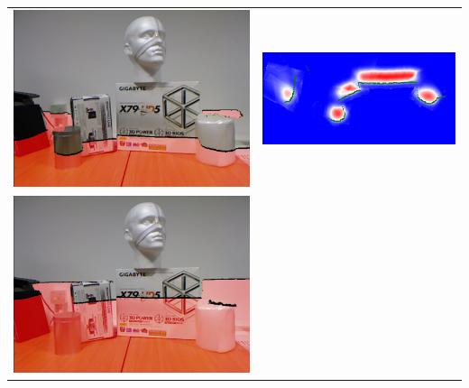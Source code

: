 \documentclass[10pt,onecolumn,letterpaper]{article}
\begin{document}
\centering
\vspace{10pt}
\begin{tabular}{cc}
\centering
\includegraphics[height=\imheight]{real/head/rgb_00050.jpg} &
\includegraphics[height=\imheight]{real/head/slice_00050.jpg} \\
\includegraphics[height=\imheight]{real/head/rgb_00080.jpg} &

\end{tabular}
\end{document}
